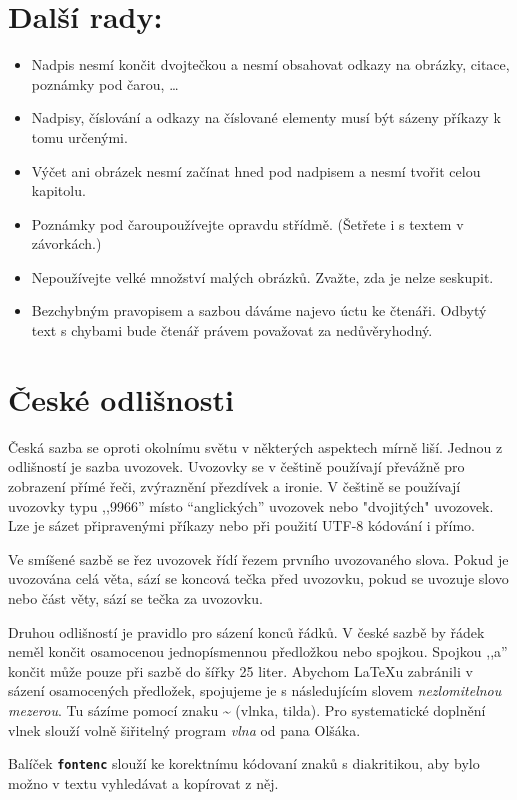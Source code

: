 \documentclass[10pt,a4paper,twocolumn]{article}
\begin{document}
    \section{Další rady:}
    \font=3.5pt
        \begin{itemize}
          \item Nadpis nesmí končit dvojtečkou a nesmí obsahovat odkazy na obrázky, citace, poznámky pod čarou, \dots
          \item Nadpisy, číslování a odkazy na číslované elementy musí být sázeny příkazy k tomu určenými.
          \item Výčet ani obrázek nesmí začínat hned pod nadpisem a nesmí tvořit celou kapitolu.
          \item Poznámky pod čarou\footnotemark používejte opravdu střídmě. (Šetřete i s textem v závorkách.)
          \item Nepoužívejte velké množství malých obrázků. Zvažte, zda je nelze seskupit.
          \item Bezchybným pravopisem a sazbou dáváme najevo úctu ke čtenáři. Odbytý text s chybami bude čtenář právem považovat za nedůvěryhodný.
        \end{itemize}

    \font=3pt
    \section{České odlišnosti}
        Česká sazba se oproti okolnímu světu v některých aspektech mírně liší. Jednou z odlišností je sazba uvozovek. Uvozovky se v češtině používají převážně pro zobrazení přímé řeči, zvýraznění přezdívek a ironie. V češtině se používají uvozovky typu ,,9966'' místo ``anglických'' uvozovek nebo "dvojitých" uvozovek. Lze je sázet připravenými příkazy nebo při použití UTF-8 kódování i přímo.\par
        Ve smíšené sazbě se řez uvozovek řídí řezem prvního uvozovaného slova. Pokud je uvozována celá věta, sází se koncová tečka před uvozovku, pokud se uvozuje slovo nebo část věty, sází se tečka za uvozovku.\par
        Druhou odlišností je pravidlo pro sázení konců řádků. V české sazbě by řádek neměl končit osamocenou jednopísmennou předložkou nebo spojkou. Spojkou ,,a'' končit může pouze při sazbě do šířky 25 liter. Abychom \LaTeX u zabránili v sázení osamocených předložek, spojujeme je s následujícím slovem \emph{nezlomitelnou mezerou}. Tu sázíme pomocí znaku \textbf{\~{}} (vlnka, tilda). Pro systematické doplnění vlnek slouží volně šiřitelný program \emph{vlna} od pana Olšáka\footnotemark.\par
        Balíček \texttt{\textbf{fontenc}} slouží ke korektnímu kódovaní znaků s diakritikou, aby bylo možno v textu vyhledávat a kopírovat z něj.
\end{document}
